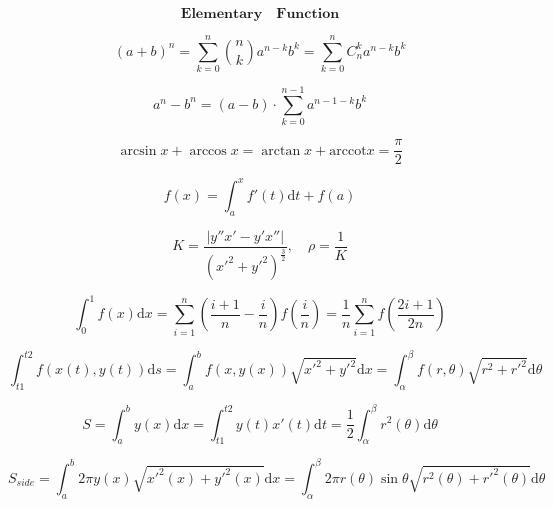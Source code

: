 \documentclass{article}
\begin{document}
    
\begin{displaymath}
    \bm{Elementary \quad Function}
\end{displaymath}

\begin{displaymath}
    (a+b)^n = \sum_{k=0}^{n}\binom{n}{k}a^{n-k}b^{k} = \sum_{k=0}^n{C_{n}^{k}a^{n-k}b^k}
\end{displaymath}

\begin{displaymath}
    a^{n}-b^{n} = (a-b) \cdot \sum_{k=0}^{n-1}a^{n-1-k}b^{k}
\end{displaymath}

\begin{displaymath}
    \arcsin x + \arccos x = \arctan x + \mathrm{arccot}x = \frac{\pi}{2} 
\end{displaymath}

\begin{displaymath}
    f(x) = \int_{a}^{x}f'(t) \mathrm{d}t + f(a)
\end{displaymath}

\begin{displaymath}
    K = \frac{|y''x'-y'x''|}{(x'^{2}+y'^{2})^{\frac{3}{2}}}, \quad \rho = \frac{1}{K}
\end{displaymath}

\begin{displaymath}
    \int_{0}^{1} f(x) \mathrm{d}x = \sum_{i=1}^{n}\left(\frac{i+1}{n}-\frac{i}{n}\right)f\left(\frac{i}{n}\right) = \frac{1}{n}\sum_{i=1}^{n}f\left(\frac{2i+1}{2n}\right)
\end{displaymath} 

\begin{displaymath}
    \int_{t1}^{t2} f(x(t),y(t)) \mathrm{d}s = \int_{a}^{b} f(x,y(x)) \sqrt{x'^2+y'^2} \mathrm{d}x = \int_{\alpha}^{\beta} f(r,\theta)\sqrt{r^2 + r'^2} \mathrm{d}\theta
\end{displaymath}

\begin{displaymath}
    S = \int_{a}^{b}y(x)\mathrm{d}x = \int_{t1}^{t2}y(t)x'(t)\mathrm{d}t = \frac{1}{2}\int_{\alpha}^{\beta}{r^2(\theta)}\mathrm{d}\theta 
\end{displaymath}

\begin{displaymath}
    S_{side} = \int_{a}^{b}2 \pi y(x)\sqrt{x'^2(x)+y'^2(x)} \mathrm{d}x = \int_{\alpha}^{\beta}{2\pi r(\theta)\sin \theta \sqrt{r^2(\theta)+r'^2(\theta)}} \mathrm{d}\theta 
\end{displaymath}
\end{document}
